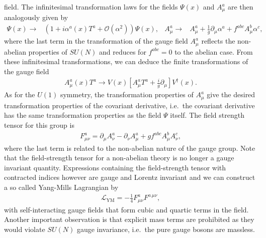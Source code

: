 field. The infinitesimal transformation laws for the fields $\Psi(x)$
and $A_\mu^a$ are then analogously given by
\begin{align}
  \Psi(x) \rightarrow & \left(1+i\alpha^a(x)T^a+\mathcal{O}(\alpha^2)\right)\Psi(x), & A_\mu^a\rightarrow & A_\mu^a + \frac{1}{g}\partial_\mu \alpha^a +
f^{abc} A_\mu^b\alpha^c,
\end{align}
where the last term in the transformation of the gauge field $A_\mu^a$
reflects the non-abelian properties of $SU(N)$ and reduces for
$f^{abc}=0$ to the abelian case. From these
infinitesimal transformations, we can deduce the finite
transformations of the gauge field
\begin{align}
   A_\mu^a(x)T^a \rightarrow   V(x)\left[A_\mu^aT^a + \frac{i}{g}\partial_\mu \right]V^\dagger(x).
\end{align}
As for the $U(1)$ symmetry, the transformation properties of $A_\mu^a$ give the
desired transformation properties of the covariant derivative,
i.e.\ the covariant derivative has the same transformation properties
as the field $\Psi$ itself. The field strength tensor for this group is
\begin{align}
  F_{\mu\nu}^a=\partial_\mu A_\nu^a - \partial_\nu A_\mu^a
  +gf^{abc}A_\mu^bA_\nu^c,
\end{align}
where the last term is related to the non-abelian nature of the
gauge group. Note that the field-strength tensor for a non-abelian
theory is no longer a gauge invariant quantity. Expressions containing the field-strength tensor with contracted indices however are gauge and Lorentz invariant and we can construct a so called Yang-Mills
Lagrangian by
\begin{align}\label{eq:ymlag}
  \mathcal{L}_{\text{YM}}=-\frac{1}{4}F^a_{\mu\nu}F^{a\,\mu\nu},
\end{align}
with self-interacting gauge fields that form cubic and quartic terms in the
field. Another important observation is that explicit mass terms are prohibited as
they would violate $SU(N)$ gauge invariance, i.e.\ the pure gauge
bosons are massless.


